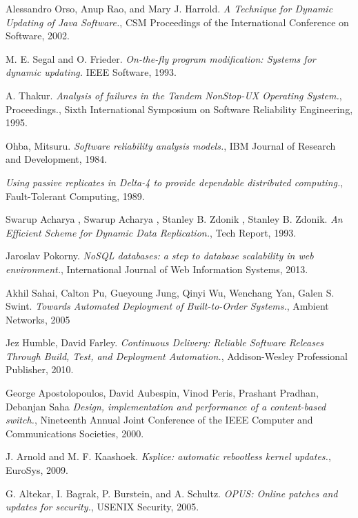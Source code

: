 \documentclass[a4paper,11pt,twoside]{article}
\begin{document}
\clearpage
\begin{thebibliography}{1}

  Alessandro Orso, Anup Rao, and Mary J. Harrold. {\em A Technique for Dynamic Updating of Java Software.}, CSM Proceedings of the International Conference on Software, 2002.
 
   M. E. Segal and O. Frieder. {\em On-the-ﬂy program modification: Systems for dynamic updating.} IEEE Software, 1993.

     A. Thakur. {\em Analysis of failures in the Tandem NonStop-UX Operating System.}, Proceedings., Sixth International Symposium on Software Reliability Engineering, 1995. 
   
     Ohba, Mitsuru. {\em Software reliability analysis models.}, IBM Journal of Research and Development, 1984.
    
     {\em Using passive replicates in Delta-4 to provide dependable distributed computing.}, Fault-Tolerant Computing, 1989. 
    
      Swarup Acharya , Swarup Acharya , Stanley B. Zdonik , Stanley B. Zdonik. {\em An Efficient Scheme for Dynamic Data Replication.}, Tech Report, 1993. 
   
	  Jaroslav Pokorny. {\em NoSQL databases: a step to database scalability in web environment.}, International Journal of Web Information Systems, 2013. 
	 
	 Akhil Sahai, Calton Pu, Gueyoung Jung, Qinyi Wu, Wenchang Yan, Galen S. Swint. {\em Towards Automated Deployment of Built-to-Order Systems.}, Ambient Networks, 2005  
	  
    Jez Humble, David Farley. {\em Continuous Delivery: Reliable Software Releases Through Build, Test, and Deployment Automation.}, Addison-Wesley Professional Publisher, 2010.     
   
     George Apostolopoulos, David Aubespin, Vinod Peris, Prashant Pradhan, Debanjan Saha {\em Design, implementation and performance of a content-based switch.}, Nineteenth Annual Joint Conference of the IEEE Computer and Communications Societies, 2000.
   
   J. Arnold and M. F. Kaashoek. {\em Ksplice: automatic rebootless kernel updates.}, EuroSys, 2009.
  
    G. Altekar, I. Bagrak, P. Burstein, and A. Schultz. {\em OPUS: Online patches and updates for security.}, USENIX Security, 2005.



\end{thebibliography}
\end{document}
